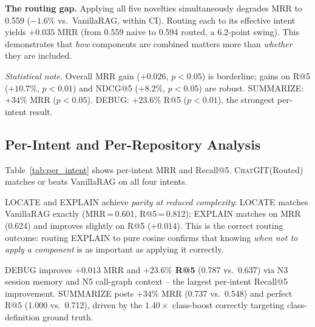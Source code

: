 \documentclass[runningheads]{llncs}
\newcommand{\chatgit}{\textsc{ChatGIT}\xspace}
\begin{document}
\textbf{The routing gap.} Applying all five novelties simultaneously
degrades MRR to 0.559 ($-1.6\%$ vs.\ VanillaRAG, within CI). Routing
each to its effective intent yields $+0.035$ MRR (from 0.559 naive to 0.594
routed, a 6.2-point swing). This demonstrates that \emph{how} components
are combined matters more than \emph{whether} they are included.

\textit{Statistical note.} Overall MRR gain ($+0.026$, $p{<}0.05$) is
borderline; gains on R@5 ($+10.7\%$, $p{<}0.01$) and NDCG@5 ($+8.2\%$,
$p{<}0.05$) are robust. SUMMARIZE: $+34\%$ MRR ($p{<}0.05$). DEBUG:
$+23.6\%$ R@5 ($p{<}0.01$), the strongest per-intent result.

\subsection{Per-Intent and Per-Repository Analysis}

Table~\ref{tab:per_intent} shows per-intent MRR and Recall@5.
\chatgit (Routed) matches or beats VanillaRAG on all four intents.

LOCATE and EXPLAIN achieve \emph{parity at reduced complexity}: LOCATE
matches VanillaRAG exactly (MRR\,=\,0.601, R@5\,=\,0.812); EXPLAIN matches
on MRR (0.624) and improves slightly on R@5 ($+0.014$). This is the correct
routing outcome: routing EXPLAIN to pure cosine confirms that knowing
\emph{when not to apply a component} is as important as applying it correctly.

DEBUG improves $+0.013$ MRR and \textbf{$+23.6\%$ R@5} (0.787 vs.\ 0.637)
via N3 session memory and N5 call-graph context -- the largest per-intent
Recall@5 improvement. SUMMARIZE posts $+34\%$ MRR (0.737 vs.\ 0.548) and
perfect R@5 (1.000 vs.\ 0.712), driven by the $1.40\times$ class-boost
correctly targeting class-definition ground truth.
\end{document}
